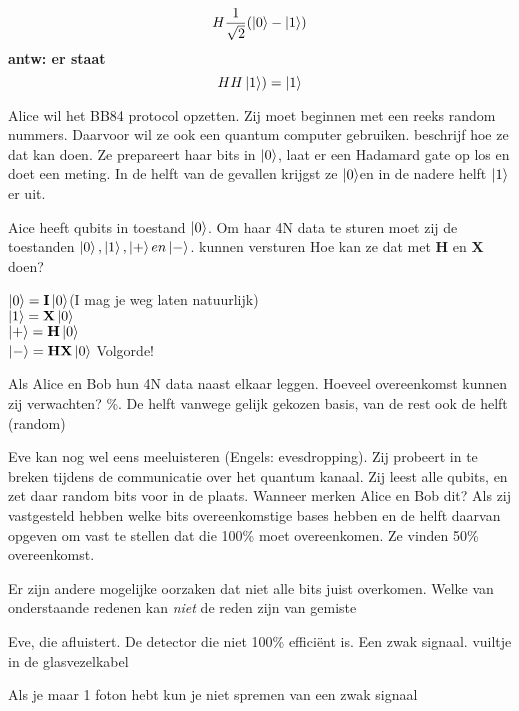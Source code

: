 \documentclass[a4paper, addpoints, 12pt
    , noanswers    %
    ]{exam}
\newcommand*{\port}[1]{\textbf{#1}}
\begin{document}
\begin{questions}
\[H\frac{1}{\sqrt{2}}(\ket{0}-\ket{1})\]
\ifprintanswers
\textbf{antw:
er staat \[HH\ket{1})=\ket{1}\]
}
\else
\fillwithlines{1in}
\fi


\question[1]
Alice wil het BB84 protocol opzetten. Zij moet beginnen met een reeks random nummers. Daarvoor wil ze ook een quantum computer gebruiken. beschrijf hoe ze dat kan doen.
\ifprintanswers
Ze prepareert haar bits in $\ket{0}$, laat er een Hadamard gate op los en doet een meting. In de helft van de gevallen krijgst ze $\ket{0}$en in de nadere helft $\ket{1}$ er uit.
\else
\fillwithlines{1in}
\fi

\question[1]
Aice heeft qubits in toestand $\ket{0}$. Om haar 4N data te sturen moet zij de toestanden $\ket{0}, \ket{1}, \ket{+} en \ket{-}$. kunnen versturen
Hoe kan ze dat met \port{H} en \port{X} doen?

\ifprintanswers
\else
$\ket{0}=\port{I}\ket{0}$(I mag je weg laten natuurlijk)\\
$\ket{1}=\port{X}\ket{0}$\\
$\ket{+}=\port{H}\ket{0}$\\
$\ket{-}=\port{H}\port{X}\ket{0}$ Volgorde!\\
\fillwithlines{1in}
\fi

\question[1]
Als Alice en Bob hun 4N data naast elkaar leggen. Hoeveel overeenkomst kunnen zij verwachten?
\%. De helft vanwege gelijk gekozen basis, van de rest ook de helft (random)
\else
\fillwithlines{1in}
\fi

Eve kan nog wel eens meeluisteren (Engels: evesdropping).  Zij probeert in te breken tijdens de communicatie over het quantum kanaal. 
Zij leest alle qubits, en zet daar random bits voor in de plaats.
Wanneer merken Alice en Bob dit?
\ifprintanswers
Als zij vastgesteld hebben welke bits overeenkomstige bases hebben en de  helft daarvan opgeven om vast te stellen dat die 100\% moet overeenkomen. Ze vinden 50\% overeenkomst.
\else
\fillwithlines{1in}
\fi

Er zijn andere mogelijke oorzaken dat niet alle bits juist overkomen. Welke van onderstaande redenen kan \textit{niet} de  reden zijn van gemiste

\begin{choices}
\choice Eve, die afluistert.
\choice De detector die niet 100\% effici\"ent is.
\correctchoice Een zwak signaal.
\choice vuiltje in de glasvezelkabel
\end{choices} 
\question[1]
\ifprintanswers
Als je maar 1 foton hebt kun je niet spremen van een zwak signaal
\else
\fillwithlines{1in}
\fi


\end{questions}
\end{document}
